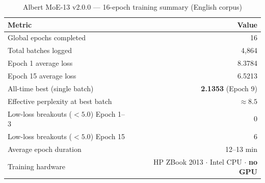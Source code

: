 \documentclass[11pt,a4paper]{article}
\begin{document}
\begin{table}[htbp]
\centering
\small
\caption{Albert MoE-13 v2.0.0 --- 16-epoch training summary (English corpus)}
\label{tab:albert_training}
\begin{tabular}{lr}
\toprule
Metric & Value \\
\midrule
Global epochs completed & 16 \\
Total batches logged & 4,864 \\
Epoch 1 average loss & 8.3784 \\
Epoch 15 average loss & 6.5213 \\
All-time best (single batch) & \textbf{2.1353} (Epoch 9) \\
Effective perplexity at best batch & $\approx 8.5$ \\
Low-loss breakouts ($< 5.0$) Epoch 1--3 & 0 \\
Low-loss breakouts ($< 5.0$) Epoch 15 & 6 \\
Average epoch duration & 12--13 min \\
Training hardware & HP ZBook 2013 $\cdot$ Intel CPU $\cdot$ \textbf{no GPU} \\
\bottomrule
\end{tabular}
\end{table}
\end{document}
